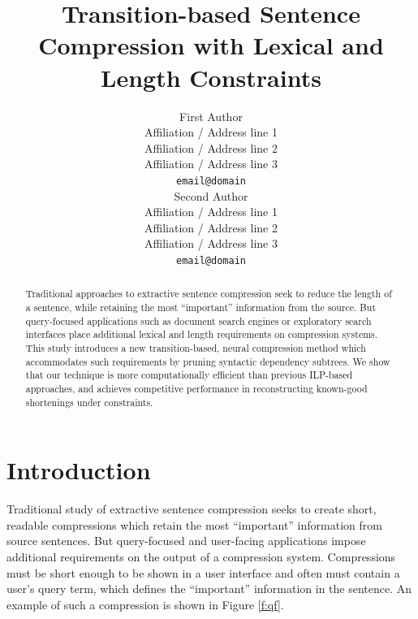 \documentclass[11pt,a4paper]{article}
\title{Transition-based Sentence Compression with Lexical and Length Constraints}
\author{First Author \\
  Affiliation / Address line 1 \\
  Affiliation / Address line 2 \\
  Affiliation / Address line 3 \\
  {\tt email@domain} \\\And
  Second Author \\
  Affiliation / Address line 1 \\
  Affiliation / Address line 2 \\
  Affiliation / Address line 3 \\
  {\tt email@domain} \\}
\date{}
\newcommand{\ahcomment}[1]{\textcolor{blue}{[#1 -AH]}}
\begin{document}
\maketitle




\begin{abstract}
Traditional approaches to extractive sentence compression seek to reduce the length of a sentence, while retaining the most ``important'' information from the source. But query-focused applications such as document search engines or exploratory search interfaces place additional lexical and length requirements on compression systems. This study introduces a new transition-based, neural compression method which accommodates such requirements by pruning syntactic dependency subtrees.  We show that our technique is more computationally efficient than previous ILP-based approaches, and achieves competitive performance in reconstructing known-good shortenings under constraints.
\end{abstract}

\section{Introduction}

Traditional study of extractive sentence compression seeks to create short, readable compressions which retain the most ``important'' information from source sentences. But query-focused and user-facing applications impose additional requirements on the output of a compression system. Compressions must be short enough to be shown in a user interface and often must contain a user's query term, which defines the ``important'' information in the sentence. An example of such a compression is shown in Figure \ref{f:qf}.
\end{document}
